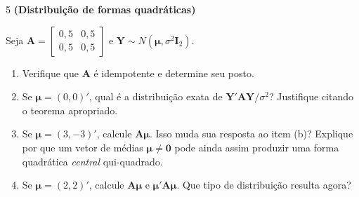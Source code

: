 \documentclass[11pt]{article}
\begin{document}
\begin{questao}{5} \textbf{(Distribuição de formas quadráticas)}

Seja $\mathbf{A} = \begin{bmatrix} 0{,}5 & 0{,}5 \\ 0{,}5 & 0{,}5 \end{bmatrix}$ e $\mathbf{Y} \sim
N(\boldsymbol\mu, \sigma^2\mathbf{I}_2)$.

\begin{enumerate}[label=(\alph*)]
  \item Verifique que $\mathbf{A}$ é idempotente e determine seu posto.
  \item Se $\boldsymbol\mu = (0,0)'$, qual é a distribuição exata de $\mathbf{Y}'\mathbf{A}\mathbf{Y}/\sigma^2$?
    Justifique citando o teorema apropriado.
  \item Se $\boldsymbol\mu = (3,-3)'$, calcule $\mathbf{A}\boldsymbol\mu$. Isso muda sua resposta
    ao item (b)? Explique por que um vetor de médias $\boldsymbol\mu \neq \mathbf{0}$ pode ainda
    assim produzir uma forma quadrática \emph{central} qui-quadrado.
  \item Se $\boldsymbol\mu = (2,2)'$, calcule $\mathbf{A}\boldsymbol\mu$ e $\boldsymbol\mu'\mathbf{A}\boldsymbol\mu$.
    Que tipo de distribuição resulta agora?
\end{enumerate}
\end{questao}
\end{document}
